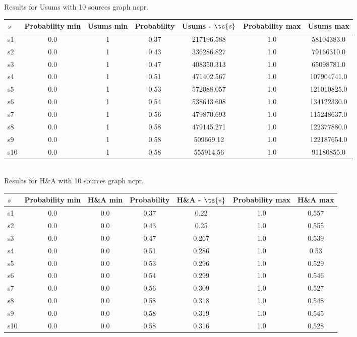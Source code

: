 \documentclass{article}
\begin{document}
\noindent Results for Usums with 10 sources graph ncpr.

\noindent\begin{tabular}{|l|c|c|c|c|c|c|}
\hline
$s$& Probability min & Usums min & Probability & Usums - $\ts{s}$ & Probability max & Usums max\\
\hline
s1 &0.0 & 1 & 0.37 & 217196.588 & 1.0 & 58104383.0\\
\hline
s2 &0.0 & 1 & 0.43 & 336286.827 & 1.0 & 79166310.0\\
\hline
s3 &0.0 & 1 & 0.47 & 408350.313 & 1.0 & 65098781.0\\
\hline
s4 &0.0 & 1 & 0.51 & 471402.567 & 1.0 & 107904741.0\\
\hline
s5 &0.0 & 1 & 0.53 & 572088.057 & 1.0 & 121010825.0\\
\hline
s6 &0.0 & 1 & 0.54 & 538643.608 & 1.0 & 134122330.0\\
\hline
s7 &0.0 & 1 & 0.56 & 479870.693 & 1.0 & 115248637.0\\
\hline
s8 &0.0 & 1 & 0.58 & 479145.271 & 1.0 & 122377880.0\\
\hline
s9 &0.0 & 1 & 0.58 & 509669.12 & 1.0 & 122187654.0\\
\hline
s10 &0.0 & 1 & 0.58 & 555914.56 & 1.0 & 91180855.0\\
\hline
\end{tabular}\\

\noindent Results for H\&A with 10 sources graph ncpr.

\noindent\begin{tabular}{|l|c|c|c|c|c|c|}
\hline
$s$& Probability min & H\&A min & Probability & H\&A - $\ts{s}$ & Probability max & H\&A max\\
\hline
s1 &0.0 & 0.0 & 0.37 & 0.22 & 1.0 & 0.557\\
\hline
s2 &0.0 & 0.0 & 0.43 & 0.25 & 1.0 & 0.555\\
\hline
s3 &0.0 & 0.0 & 0.47 & 0.267 & 1.0 & 0.539\\
\hline
s4 &0.0 & 0.0 & 0.51 & 0.286 & 1.0 & 0.53\\
\hline
s5 &0.0 & 0.0 & 0.53 & 0.296 & 1.0 & 0.529\\
\hline
s6 &0.0 & 0.0 & 0.54 & 0.299 & 1.0 & 0.546\\
\hline
s7 &0.0 & 0.0 & 0.56 & 0.309 & 1.0 & 0.527\\
\hline
s8 &0.0 & 0.0 & 0.58 & 0.318 & 1.0 & 0.548\\
\hline
s9 &0.0 & 0.0 & 0.58 & 0.319 & 1.0 & 0.545\\
\hline
s10 &0.0 & 0.0 & 0.58 & 0.316 & 1.0 & 0.528\\
\hline
\end{tabular}\\
\end{document}

